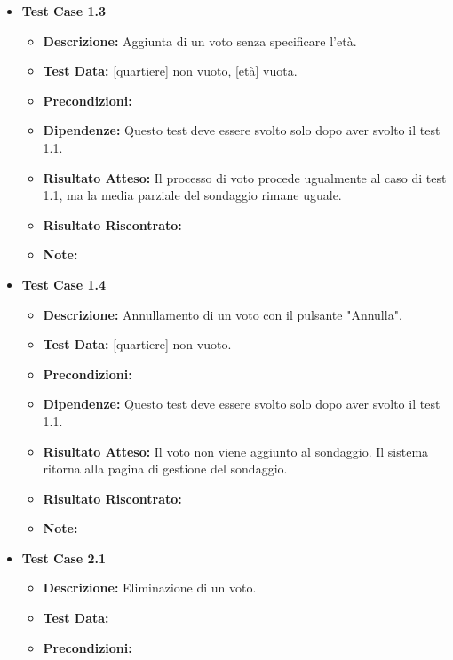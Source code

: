 \begin{itemize}
            \item \textbf{Test Case 1.3}
                \begin{itemize}
                    \item \textbf{Descrizione:} Aggiunta di un voto senza specificare l'età.
                    \item \textbf{Test Data:} [quartiere] non vuoto, [età] vuota.
                    \item \textbf{Precondizioni:}
                    \item \textbf{Dipendenze:} Questo test deve essere svolto solo dopo aver svolto il test 1.1.
                    \item \textbf{Risultato Atteso:} Il processo di voto procede ugualmente al caso di test 1.1, ma la media parziale del sondaggio rimane uguale.
                    \item \textbf{Risultato Riscontrato:}
                    \item \textbf{Note:}
                \end{itemize}
            \item \textbf{Test Case 1.4}
                \begin{itemize}
                    \item \textbf{Descrizione:} Annullamento di un voto con il pulsante "Annulla".
                    \item \textbf{Test Data:} [quartiere] non vuoto.
                    \item \textbf{Precondizioni:}
                    \item \textbf{Dipendenze:} Questo test deve essere svolto solo dopo aver svolto il test 1.1.
                    \item \textbf{Risultato Atteso:} Il voto non viene aggiunto al sondaggio. Il sistema ritorna alla pagina di gestione del sondaggio.
                    \item \textbf{Risultato Riscontrato:}
                    \item \textbf{Note:}
                \end{itemize}
            \item \textbf{Test Case 2.1}
                \begin{itemize}
                    \item \textbf{Descrizione:} Eliminazione di un voto.
                    \item \textbf{Test Data:}
                    \item \textbf{Precondizioni:}

\end{itemize}
\end{itemize}
